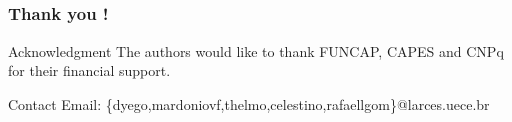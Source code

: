 \documentclass[aspectratio=169]{beamer}
\begin{document}
\subsection{}
\begin{frame}
\frametitle{Thank you !}

\begin{block}{Acknowledgment}\small
The authors would like to thank FUNCAP, CAPES and
CNPq for their financial support.



\end{block}

\begin{block}{Contact}\small
Email: \{dyego,mardoniovf,thelmo,celestino,rafaellgom\}@larces.uece.br
\end{block}

\end{frame}
\end{document}
